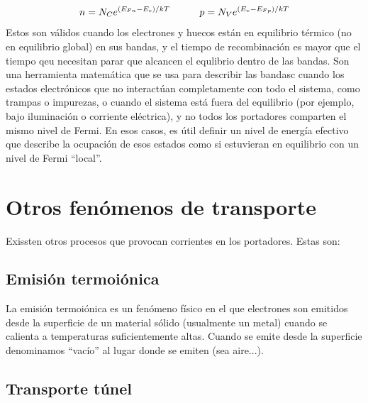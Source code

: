 \begin{equation}
	n=N_C e^{(E_{Fn}-E_c)/kT} \quad \quad \quad 
	p=N_V e^{(E_{v}-E_{Fp})/kT}
\end{equation}
Estos son válidos cuando los electrones y huecos están en equilibrio térmico (no en equilibrio global) en sus bandas, y el tiempo de recombinación es mayor que el tiempo qeu necesitan parar que alcancen el equlibrio dentro de las bandas. Son una herramienta matemática que se usa para describir las bandasc cuando los estados electrónicos que no interactúan completamente con todo el sistema, como trampas o impurezas, o cuando el sistema está fuera del equilibrio (por ejemplo, bajo iluminación o corriente eléctrica), y no todos los portadores comparten el mismo nivel de Fermi. En esos casos, es útil definir un nivel de energía efectivo que describe la ocupación de esos estados como si estuvieran en equilibrio con un nivel de Fermi ``local''.




\section{Otros fenómenos de transporte}

Exissten otros procesos que provocan corrientes en los portadores. Estas son:

\subsection{Emisión termoiónica}

La emisión termoiónica es un fenómeno físico en el que electrones son emitidos desde la superficie de un material sólido (usualmente un metal) cuando se calienta a temperaturas suficientemente altas. Cuando se emite desde la superficie denominamos ``vacío'' al lugar donde se emiten (sea aire...).

\subsection{Transporte túnel}

